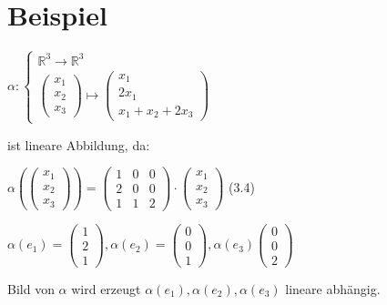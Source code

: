 \documentclass[a4paper, openany]{book}
\begin{document}
      \section{Beispiel}

      $\alpha : \begin{cases}\mathbb{R}^3 \rightarrow \mathbb{R}^3 \\ \begin{pmatrix}x_1 \\ x_2 \\ x_3 \end{pmatrix} \mapsto \begin{pmatrix}x_1 \\ 2x_1 \\ x_1+x_2+2x_3 \end{pmatrix} \end{cases}$ 

      \par \medskip

      ist lineare Abbildung, da:

      \par \medskip

      $\alpha(\begin{pmatrix}x_1 \\ x_2 \\ x_3\end{pmatrix}) = \begin{pmatrix}1 & 0 & 0 \\ 2 & 0 & 0 \\ 1 & 1 & 2 \end{pmatrix} \cdot \begin{pmatrix}x_1 \\ x_2 \\ x_3 \end{pmatrix}$ (3.4)

      $\alpha(e_1) = \begin{pmatrix}1 \\ 2 \\ 1 \end{pmatrix}, \alpha(e_2) = \begin{pmatrix}0 \\ 0 \\ 1 \end{pmatrix}, \alpha(e_3) \begin{pmatrix}0 \\0 \\ 2 \end{pmatrix}$

      Bild von $\alpha$ wird erzeugt $\alpha(e_1), \alpha(e_2), \alpha(e_3)$ lineare abhängig.
\end{document}
